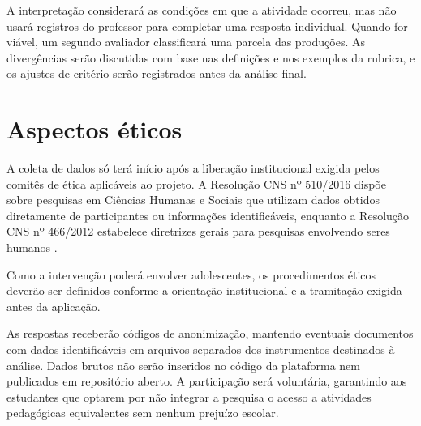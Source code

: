 A interpretação considerará as condições em que a atividade ocorreu, mas não usará registros do professor para completar uma resposta individual. Quando for viável, um segundo avaliador classificará uma parcela das produções. As divergências serão discutidas com base nas definições e nos exemplos da rubrica, e os ajustes de critério serão registrados antes da análise final.

\section{Aspectos éticos}

A coleta de dados só terá início após a liberação institucional exigida pelos comitês de ética aplicáveis ao projeto. A Resolução CNS nº 510/2016 dispõe sobre pesquisas em Ciências Humanas e Sociais que utilizam dados obtidos diretamente de participantes ou informações identificáveis, enquanto a Resolução CNS nº 466/2012 estabelece diretrizes gerais para pesquisas envolvendo seres humanos \cite{brasil2016cns510,brasil2012cns466}.

Como a intervenção poderá envolver adolescentes, os procedimentos éticos deverão ser definidos conforme a orientação institucional e a tramitação exigida antes da aplicação.

As respostas receberão códigos de anonimização, mantendo eventuais documentos com dados identificáveis em arquivos separados dos instrumentos destinados à análise. Dados brutos não serão inseridos no código da plataforma nem publicados em repositório aberto. A participação será voluntária, garantindo aos estudantes que optarem por não integrar a pesquisa o acesso a atividades pedagógicas equivalentes sem nenhum prejuízo escolar.
